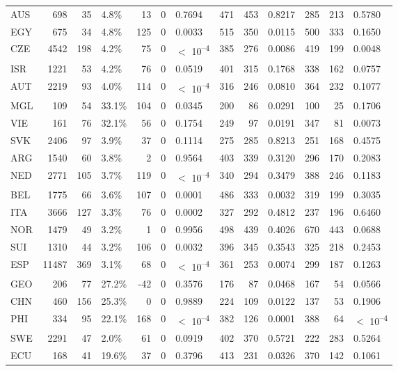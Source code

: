 \begin{tabular}[t]{lrrlrrlrrlrrl}
AUS & 698 & 35 & 4.8\% & 13 & 0 & 0.7694 & 471 & 453 & 0.8217 & 285 & 213 & 0.5780\\
EGY & 675 & 34 & 4.8\% & 125 & 0 & 0.0033 & 515 & 350 & 0.0115 & 500 & 333 & 0.1650\\
CZE & 4542 & 198 & 4.2\% & 75 & 0 & $<$ 10\textsuperscript{--4} & 385 & 276 & 0.0086 & 419 & 199 & 0.0048\\
ISR & 1221 & 53 & 4.2\% & 76 & 0 & 0.0519 & 401 & 315 & 0.1768 & 338 & 162 & 0.0757\\
AUT & 2219 & 93 & 4.0\% & 114 & 0 & $<$ 10\textsuperscript{--4} & 316 & 246 & 0.0810 & 364 & 232 & 0.1077\\
MGL & 109 & 54 & 33.1\% & 104 & 0 & 0.0345 & 200 & 86 & 0.0291 & 100 & 25 & 0.1706\\
VIE & 161 & 76 & 32.1\% & 56 & 0 & 0.1754 & 249 & 97 & 0.0191 & 347 & 81 & 0.0073\\
SVK & 2406 & 97 & 3.9\% & 37 & 0 & 0.1114 & 275 & 285 & 0.8213 & 251 & 168 & 0.4575\\
ARG & 1540 & 60 & 3.8\% & 2 & 0 & 0.9564 & 403 & 339 & 0.3120 & 296 & 170 & 0.2083\\
NED & 2771 & 105 & 3.7\% & 119 & 0 & $<$ 10\textsuperscript{--4} & 340 & 294 & 0.3479 & 388 & 246 & 0.1183\\
BEL & 1775 & 66 & 3.6\% & 107 & 0 & 0.0001 & 486 & 333 & 0.0032 & 319 & 199 & 0.3035\\
ITA & 3666 & 127 & 3.3\% & 76 & 0 & 0.0002 & 327 & 292 & 0.4812 & 237 & 196 & 0.6460\\
NOR & 1479 & 49 & 3.2\% & 1 & 0 & 0.9956 & 498 & 439 & 0.4026 & 670 & 443 & 0.0688\\
SUI & 1310 & 44 & 3.2\% & 106 & 0 & 0.0032 & 396 & 345 & 0.3543 & 325 & 218 & 0.2453\\
ESP & 11487 & 369 & 3.1\% & 68 & 0 & $<$ 10\textsuperscript{--4} & 361 & 253 & 0.0074 & 299 & 187 & 0.1263\\
GEO & 206 & 77 & 27.2\% & -42 & 0 & 0.3576 & 176 & 87 & 0.0468 & 167 & 54 & 0.0566\\
CHN & 460 & 156 & 25.3\% & 0 & 0 & 0.9889 & 224 & 109 & 0.0122 & 137 & 53 & 0.1906\\
PHI & 334 & 95 & 22.1\% & 168 & 0 & $<$ 10\textsuperscript{--4} & 382 & 126 & 0.0001 & 388 & 64 & $<$ 10\textsuperscript{--4}\\
SWE & 2291 & 47 & 2.0\% & 61 & 0 & 0.0919 & 402 & 370 & 0.5721 & 222 & 283 & 0.5264\\
ECU & 168 & 41 & 19.6\% & 37 & 0 & 0.3796 & 413 & 231 & 0.0326 & 370 & 142 & 0.1061\\

\end{tabular}

